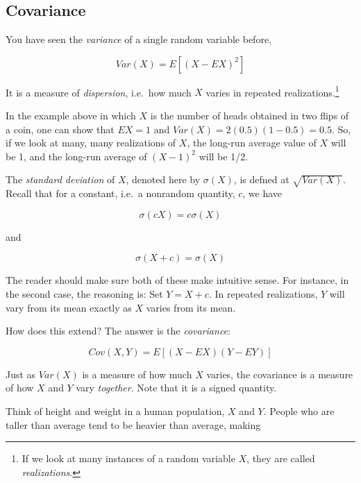\subsection{Covariance}

You have seen the \textit{variance} of a single random variable before,

\begin{equation}
Var(X) = E[(X - EX)^2]
\end{equation}

It is a measure of \textit{dispersion}, i.e.\ how much $X$
varies in repeated realizations.\footnote{If we look at many instances
of a random variable $X$, they are called \textit{realizations}.}

In the example above in which $X$ is the number of heads obtained in two
flips of a coin, one can show that $EX = 1$ and
$Var(X) = 2(0.5)(1-0.5) = 0.5$.  So, if we look at many, many
realizations of $X$, the long-run average value of $X$ will be 1,
and the long-run average of $(X - 1)^2$ will be 1/2.

The \textit{standard deviation} of $X$, denoted here by $\sigma(X)$,
is defned at $\sqrt{Var(X)}$.  Recall that for a constant, i.e.\ a
nonrandom quantity, $c$, we have

\begin{equation}
\sigma(cX) = c \sigma(X)
\end{equation}

and 

\begin{equation}
\sigma(X+c) = \sigma(X)
\end{equation}

The reader should make sure both of these make intuitive sense.  For
instance, in the second case, the reasoning is:  Set $Y = X + c$.  In
repeated realizations, $Y$ will vary from its mean exactly as $X$
varies from its mean.

How does this extend?  The answer is the \textit{covariance}:

\begin{equation}
Cov(X,Y) = E[(X - EX) (Y - EY)]
\end{equation}

Just as $Var(X)$ is a measure of how much $X$ varies, the covariance is
a measure of how $X$ and $Y$ vary \textit{together}.  Note that it is a
signed quantity.

Think of height and weight in a human population, $X$ and $Y$. People
who are taller than average tend to be heavier than average, making

